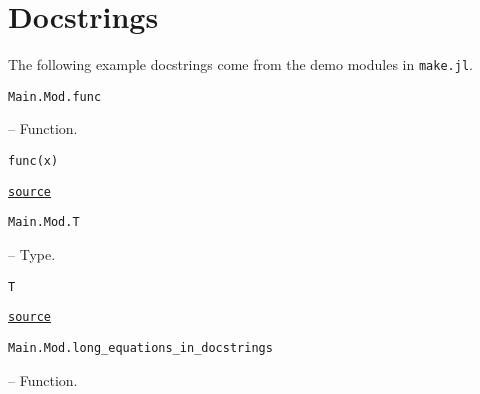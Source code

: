 \chapter{Docstrings}



\label{4859465668994674752}{}


The following example docstrings come from the demo modules in \texttt{make.jl}.


\hypertarget{5669384191785722396}{\texttt{Main.Mod.func}}  -- {Function.}

\begin{adjustwidth}{2em}{0pt}


\begin{verbatim}
func(x)
\end{verbatim}




\href{https://example.org/Repository.jl/blob/test/examples/make.jl#L27-31}{\texttt{source}}


\end{adjustwidth}
\hypertarget{1885743281855441478}{\texttt{Main.Mod.T}}  -- {Type.}

\begin{adjustwidth}{2em}{0pt}


\begin{verbatim}
T
\end{verbatim}




\href{https://example.org/Repository.jl/blob/test/examples/make.jl#L34-38}{\texttt{source}}


\end{adjustwidth}
\hypertarget{15818938160560313688}{\texttt{Main.Mod.long\_equations\_in\_docstrings}}  -- {Function.}

